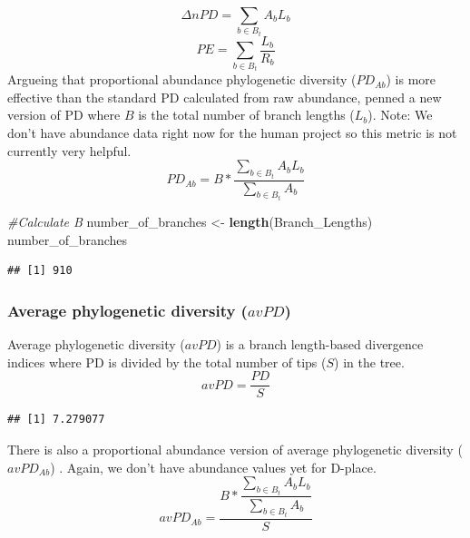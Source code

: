 \documentclass[]{book}
\newenvironment{Shaded}{\begin{snugshade}}{\end{snugshade}}
\newcommand{\KeywordTok}[1]{\textcolor[rgb]{0.13,0.29,0.53}{\textbf{{#1}}}}
\newcommand{\StringTok}[1]{\textcolor[rgb]{0.31,0.60,0.02}{{#1}}}
\newcommand{\CommentTok}[1]{\textcolor[rgb]{0.56,0.35,0.01}{\textit{{#1}}}}
\newcommand{\OperatorTok}[1]{\textcolor[rgb]{0.81,0.36,0.00}{\textbf{{#1}}}}
\newcommand{\NormalTok}[1]{{#1}}
\theoremstyle{definition}
\theoremstyle{definition}
\theoremstyle{remark}
\begin{document}
\[\Delta n PD = \sum_{b \in B_{t}}^{}A_{b}L_{b}\]
\[PE = \sum_{b \in B_{t}}^{}\dfrac{L_{b}}{R_{b}}\] Argueing that
proportional abundance phylogenetic diversity (\(PD_{Ab}\)) is more
effective than the standard PD calculated from raw abundance,
\citet{Vellend2011} penned a new version of PD where \(B\) is the total
number of branch lengths (\(L_{b}\)). Note: We don't have abundance data
right now for the human project so this metric is not currently very
helpful.\\
\[PD_{Ab} = B * \dfrac{\sum_{b \in B_{t}}^{}A_{b}L_{b}}{\sum_{b \in B_{t}}^{}A_{b}}\]

\begin{Shaded}
\begin{Highlighting}[]
\CommentTok{#Calculate B}
\NormalTok{number_of_branches <-}\StringTok{ }\KeywordTok{length}\NormalTok{(Branch_Lengths)}
\NormalTok{number_of_branches}
\end{Highlighting}
\end{Shaded}

\begin{verbatim}
## [1] 910
\end{verbatim}

\subsubsection{\texorpdfstring{Average phylogenetic diversity
(\(avPD\))}{Average phylogenetic diversity (avPD)}}\label{average-phylogenetic-diversity-avpd}

Average phylogenetic diversity (\(avPD\)) \citep{Clarke2001} is a branch
length-based divergence indices where PD is divided by the total number
of tips (\(S\)) in the tree. \[avPD = \dfrac{PD}{S}\]

\begin{Shaded}
\end{Shaded}

\begin{verbatim}
## [1] 7.279077
\end{verbatim}

There is also a proportional abundance version of average phylogenetic
diversity (\(avPD_{Ab}\)) \citep{Tucker2016}. Again, we don't have
abundance values yet for D-place.
\[avPD_{Ab} = \dfrac{B * \dfrac{\sum_{b \in B_{t}}^{}A_{b}L_{b}}{\sum_{b \in B_{t}}^{}A_{b}}}{S}\]
\end{document}
